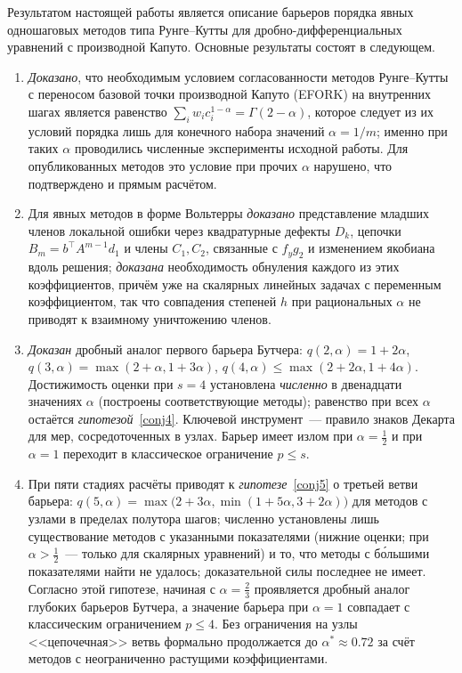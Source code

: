 \documentclass[11pt,a4paper]{article}
\theoremstyle{plain}
\theoremstyle{definition}
\newcommand{\G}{\Gamma}
\begin{document}
Результатом настоящей работы является описание барьеров порядка явных одношаговых методов типа Рунге--Кутты для дробно-дифференциальных уравнений с производной Капуто. Основные результаты состоят в следующем.
\begin{enumerate}
\item \emph{Доказано}, что необходимым условием согласованности методов Рунге--Кутты с переносом базовой точки производной Капуто (EFORK) на внутренних шагах является равенство $\sum_iw_ic_i^{1-\alpha}=\G(2-\alpha)$, которое следует из их условий порядка лишь для конечного набора значений $\alpha=1/m$; именно при таких $\alpha$ проводились численные эксперименты исходной работы. Для опубликованных методов это условие при прочих $\alpha$ нарушено, что подтверждено и прямым расчётом.
\item Для явных методов в форме Вольтерры \emph{доказано} представление младших членов локальной ошибки через квадратурные дефекты $D_k$, цепочки $B_m=b^{\top}A^{m-1}d_1$ и члены $C_1,C_2$, связанные с $f_yg_2$ и изменением якобиана вдоль решения; \emph{доказана} необходимость обнуления каждого из этих коэффициентов, причём уже на скалярных линейных задачах с переменным коэффициентом, так что совпадения степеней $h$ при рациональных $\alpha$ не приводят к взаимному уничтожению членов.
\item \emph{Доказан} дробный аналог первого барьера Бутчера: $q(2,\alpha)=1+2\alpha$, $q(3,\alpha)=\max(2+\alpha,1+3\alpha)$, $q(4,\alpha)\le\max(2+2\alpha,1+4\alpha)$. Достижимость оценки при $s=4$ установлена \emph{численно} в двенадцати значениях $\alpha$ (построены соответствующие методы); равенство при всех $\alpha$ остаётся \emph{гипотезой}~\ref{conj4}. Ключевой инструмент~--- правило знаков Декарта для мер, сосредоточенных в узлах. Барьер имеет излом при $\alpha=\frac12$ и при $\alpha=1$ переходит в классическое ограничение $p\le s$.
\item При пяти стадиях расчёты приводят к \emph{гипотезе}~\ref{conj5} о третьей ветви барьера: $q(5,\alpha)=\max\bigl(2+3\alpha,\min(1+5\alpha,3+2\alpha)\bigr)$ для методов с узлами в пределах полутора шагов; численно установлены лишь существование методов с указанными показателями (нижние оценки; при $\alpha>\frac12$~--- только для скалярных уравнений) и то, что методы с бо́льшими показателями найти не удалось; доказательной силы последнее не имеет. Согласно этой гипотезе, начиная с $\alpha=\frac23$ проявляется дробный аналог глубоких барьеров Бутчера, а значение барьера при $\alpha=1$ совпадает с классическим ограничением $p\le4$. Без ограничения на узлы <<цепочечная>> ветвь формально продолжается до $\alpha^*\approx0.72$ за счёт методов с неограниченно растущими коэффициентами.

\end{enumerate}
\end{document}
